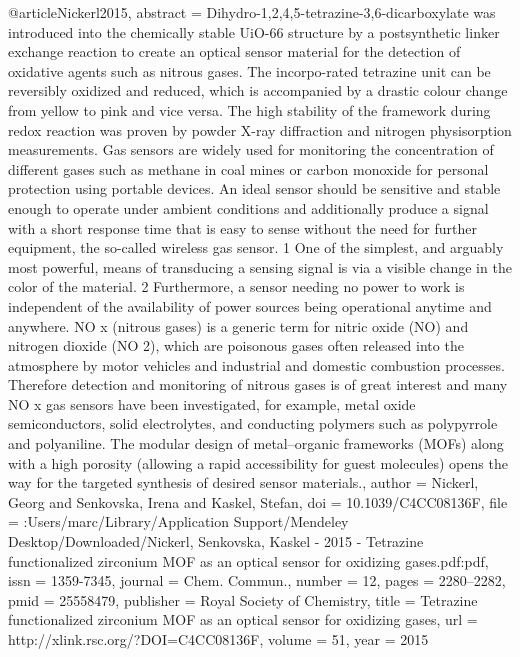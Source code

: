 @article{Nickerl2015,
abstract = {Dihydro-1,2,4,5-tetrazine-3,6-dicarboxylate was introduced into the chemically stable UiO-66 structure by a postsynthetic linker exchange reaction to create an optical sensor material for the detection of oxidative agents such as nitrous gases. The incorpo-rated tetrazine unit can be reversibly oxidized and reduced, which is accompanied by a drastic colour change from yellow to pink and vice versa. The high stability of the framework during redox reaction was proven by powder X-ray diffraction and nitrogen physisorption measurements. Gas sensors are widely used for monitoring the concentration of different gases such as methane in coal mines or carbon monoxide for personal protection using portable devices. An ideal sensor should be sensitive and stable enough to operate under ambient conditions and additionally produce a signal with a short response time that is easy to sense without the need for further equipment, the so-called wireless gas sensor. 1 One of the simplest, and arguably most powerful, means of transducing a sensing signal is via a visible change in the color of the material. 2 Furthermore, a sensor needing no power to work is independent of the availability of power sources being operational anytime and anywhere. NO x (nitrous gases) is a generic term for nitric oxide (NO) and nitrogen dioxide (NO 2), which are poisonous gases often released into the atmosphere by motor vehicles and industrial and domestic combustion processes. Therefore detection and monitoring of nitrous gases is of great interest and many NO x gas sensors have been investigated, for example, metal oxide semiconductors, solid electrolytes, and conducting polymers such as polypyrrole and polyaniline. The modular design of metal–organic frameworks (MOFs) along with a high porosity (allowing a rapid accessibility for guest molecules) opens the way for the targeted synthesis of desired sensor materials.},
author = {Nickerl, Georg and Senkovska, Irena and Kaskel, Stefan},
doi = {10.1039/C4CC08136F},
file = {:Users/marc/Library/Application Support/Mendeley Desktop/Downloaded/Nickerl, Senkovska, Kaskel - 2015 - Tetrazine functionalized zirconium MOF as an optical sensor for oxidizing gases.pdf:pdf},
issn = {1359-7345},
journal = {Chem. Commun.},
number = {12},
pages = {2280--2282},
pmid = {25558479},
publisher = {Royal Society of Chemistry},
title = {{Tetrazine functionalized zirconium MOF as an optical sensor for oxidizing gases}},
url = {http://xlink.rsc.org/?DOI=C4CC08136F},
volume = {51},
year = {2015}
}
